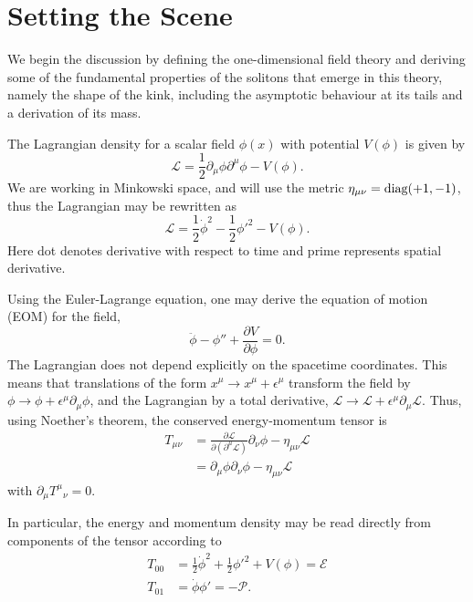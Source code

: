 \documentclass[11pt, oneside]{article}  	%
\numberwithin{equation}{section}
\begin{document}
\section{Setting the Scene} \label{set_scene}
We begin the discussion by defining the  one-dimensional field theory and deriving some of the fundamental properties of the solitons that emerge in this theory, namely the shape of the kink, including the asymptotic behaviour at its tails and a derivation of its mass.\par
The Lagrangian density for a scalar field $\phi(x)$ with potential $V(\phi)$ is given by
\begin{equation}\label{lagrangian}
\mathcal{L} = \frac{1}{2} \partial_\mu \phi \partial^\mu \phi  - V(\phi).
\end{equation} 
We are working in Minkowski space, and will use the metric $\eta_{\mu\nu} = \textup{diag}(+1,-1)$, thus the Lagrangian may be rewritten as
\begin{equation}
\mathcal{L} = \frac{1}{2}\dot{\phi}^2 -  \frac{1}{2}{\phi'}^2   - V(\phi).
\end{equation}
Here dot denotes derivative with respect to time and prime represents spatial derivative.\par
Using the Euler-Lagrange equation, one may derive the equation of motion (EOM) for the field,
\begin{equation}\label{EOM}
\ddot{\phi} - {\phi}'' + \frac{\partial V}{\partial \phi} = 0.
\end{equation}
The Lagrangian does not depend explicitly on the spacetime coordinates. This means that translations of the form $x^\mu \rightarrow x^\mu + \epsilon ^\mu$ transform the field by $\phi \rightarrow \phi + \epsilon^\mu \partial_\mu \phi$, and the Lagrangian by a total derivative, $\mathcal{L}\rightarrow \mathcal{L} + \epsilon^\mu \partial_\mu \mathcal{L}$. Thus, using Noether's theorem, the conserved energy-momentum tensor is
\begin{align}
T_{\mu \nu} &= \frac{\partial \mathcal{L}}{\partial \left (\partial^\mu \mathcal{L}\right )} \partial_\nu\phi - \eta_{\mu\nu} \mathcal{L}  \nonumber \\
&=  \partial_\mu\phi \partial_\nu\phi - \eta_{\mu\nu} \mathcal{L}  
\end{align}
with $\partial_{\mu}{T^{\mu}}_{\nu} = 0$.\par
In particular, the energy and momentum density may be read directly from components of the tensor according to
 \begin{align}
T_{00} &= \frac{1}{2}\dot{\phi}^2 +  \frac{1}{2}{\phi'}^2   +V(\phi) = \mathcal{E} \label{energy}\\
T_{01} &= \dot{\phi} \phi'  = -\mathcal{P}. \label{momentum}
\end{align}\par
\end{document}
